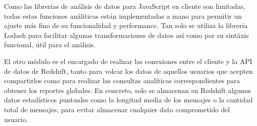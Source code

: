 Como las librerías de análisis de datos para JavaScript en cliente son limitadas, todas estas funciones análiticas están implementadas a mano para permitir un ajuste más fino de su funcionalidad y performance. Tan solo se utiliza la librería Lodash para facilitar algunas transformaciones de datos así como por su sintáxis funcional, útil para el análisis\cite{Lodash}.

El otro módulo es el encargado de realizar las conexiones entre el cliente y la API de datos de Redshift, tanto para volcar los datos de aquellos usuarios que acepten compartirlos como para realizar las consultas analíticas correspondientes para obtener los reportes globales. En concreto, solo se almacenan en Redshift algunos datos estadísticos puntuales como la longitud media de los mensajes o la cantidad total de mensajes, para evitar almacenar cualquier dato comprometido del usuario.
